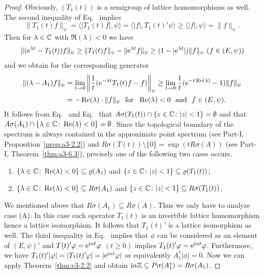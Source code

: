 \begin{proof}
	Obviously, $(T_{1}(t))$ is a semigroup of lattice homomorphisms as well. 
	The second inequality of Eq.~ implies
	\begin{equation}\label{eq:c3-4.3}
	\|T_{1}(t)f\|_{\psi} = \langle|T_{1}(t)f|,\psi\rangle = \langle|f|,T_{1}(t)'\psi\rangle \geq \langle|f|,\psi\rangle = \|f\|_{\psi} .
	\end{equation}
	Then for $\lambda \in \mathbb{C} $ with $\Re(\lambda) < 0$ we have 
	\[ 
	\|(\eu^{\lambda t}-T_{1}(t))f\|_{\psi} \geq \|T_{1}(t)f\|_{\psi}-\|\eu^{\lambda t}f\|_{\psi} \geq (1-|\eu^{\lambda t}|)\|f\|_{\psi} \ (f \in (E,\psi))
	\]
	and we obtain for the corresponding generator
	\begin{equation}\label{eq:c3-4.4}
		\begin{split}
		\|(\lambda-A_{1})f\|_{\psi} &= \lim_{t \to 0}\left\|\frac{1}{t}(\eu^{-\lambda t}T_{1}(t)f-f)\right\|_{\psi} \geq \lim_{t \to 0}\frac{1}{t}(\eu^{-t\Re(\lambda)}-1)\|f\|_{\psi}\\
		&= -\Re(\lambda)\cdot\|f\|_{\psi} \ \text{ for } \ \Re(\lambda) < 0 \ \text{ and } \ f \in (E,\psi) .
		\end{split}
	\end{equation}
	It follows from Eq.~ and Eq.~ that $A\sigma(T_{1}(t))\cap\{z \in \mathbb{C}  \colon |z| < 1\} = \emptyset$ and that $A\sigma(A_{1})\cap\{\lambda \in \mathbb{C}  \colon \mathop{}\!\mathrm{Re}(\lambda) < 0\} = \emptyset$. 
	Since the topological boundary of the spectrum is always contained in the approximate point spectrum (see Part-I, Proposition~\ref{prop:a3-2.2}) and 
    $R\sigma(T(t))\setminus\{0\} = \exp(tR\sigma(A))$ (see Part-I, Theorem~\ref{thm:a3-6.3}), precisely one of the following two cases occurs.
	\begin{enumerate}[\upshape (A)]
		\item
		$\{\lambda \in \C  \colon \Re(\lambda) < 0\} \subseteq \rho(A_{1})$ and $\{z \in \C  \colon |z| < 1\} \subseteq \rho(T_{1}(t))$;
		
		\item
		$\{\lambda \in \mathbb{C}  \colon \mathop{}\!\mathrm{Re}(\lambda) < 0\} \subseteq R\sigma(A_{1})$ and $\{z \in \mathbb{C}  \colon |z| < 1\} \subseteq R\sigma(T_{1}(t))$.
	\end{enumerate}
	
	We mentioned above that $R\sigma(A_{1}) \subseteq R\sigma(A)$. 
	Thus we only have to analyze case (A). 
	In this case each operator $T_{1}(t)$ is an invertible lattice homomorphism hence a lattice isomorphism. 
	It follows that $T_{1}(t)'$ is a lattice isomorphism as well. 
	The third inequality in Eq.~ implies that $\phi$ can be considered as an element of\/ $(E,\psi)'$ and $T(t)'\phi = \eu^{\im\alpha t}\phi$ $(t \geq 0)$ implies $T_{1}(t)'\phi = \eu^{\im\alpha t}\phi$. 
	Furthermore, we have
	$T_{1}(t)'|\phi| = |T_{1}(t)'\phi| = |\eu^{\im\alpha t}\phi|$ or equivalently $A_{1}^*|\phi| = 0$.
	Now we can apply 
	Theorem~\ref{thm:c3-2.2} 
	and obtain $\mathrm{i}\alpha\mathbb{Z} \subseteq P\sigma(A_{1}^*) = R\sigma(A_{1})$.
	\end{proof}
